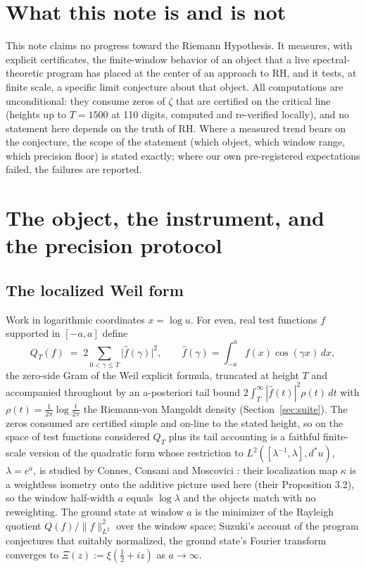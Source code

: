 \documentclass[10pt]{article}
\begin{document}
\setcounter{section}{-1}

\section{What this note is and is not}\label{sec:scope}

This note claims no progress toward the Riemann Hypothesis. It measures, with explicit certificates, the finite-window behavior of an object that a live spectral-theoretic program has placed at the center of an approach to RH, and it tests, at finite scale, a specific limit conjecture about that object. All computations are unconditional: they consume zeros of $\zeta$ that are certified on the critical line (heights up to $T = 1500$ at 110 digits, computed and re-verified locally), and no statement here depends on the truth of RH. Where a measured trend bears on the conjecture, the scope of the statement (which object, which window range, which precision floor) is stated exactly; where our own pre-registered expectations failed, the failures are reported.

\section{The object, the instrument, and the precision protocol}\label{sec:object}

\subsection{The localized Weil form}\label{sec:localized}

Work in logarithmic coordinates $x = \log u$. For even, real test functions $f$ supported in $[-a, a]$ define
\[
Q_T(f) \;=\; 2 \sum_{0 < \gamma \le T} \big|\hat f(\gamma)\big|^2, \qquad \hat f(\gamma) = \int_{-a}^{a} f(x) \cos(\gamma x)\, dx,
\]
the zero-side Gram of the Weil explicit formula, truncated at height $T$ and accompanied throughout by an a-posteriori tail bound $2\int_T^\infty |\hat f(t)|^2 \rho(t)\, dt$ with $\rho(t) = \frac{1}{2\pi}\log\frac{t}{2\pi}$ the Riemann-von Mangoldt density (Section~\ref{sec:suite}). The zeros consumed are certified simple and on-line to the stated height, so on the space of test functions considered $Q_T$ plus its tail accounting is a faithful finite-scale version of the quadratic form whose restriction to $L^2([\lambda^{-1}, \lambda], d^*u)$, $\lambda = e^a$, is studied by Connes, Consani and Moscovici \cite[Section 3]{CCM}: their localization map $\kappa$ is a weightless isometry onto the additive picture used here (their Proposition 3.2), so the window half-width $a$ equals $\log \lambda$ and the objects match with no reweighting. The ground state at window $a$ is the minimizer of the Rayleigh quotient $Q(f)/\|f\|_{L^2}^2$ over the window space; Suzuki's account of the program \cite[conjecture (1.2), attributed there to the expectation of CCM]{Su} conjectures that suitably normalized, the ground state's Fourier transform converges to $\Xi(z) := \xi(\tfrac12 + iz)$ as $a \to \infty$.
\end{document}
